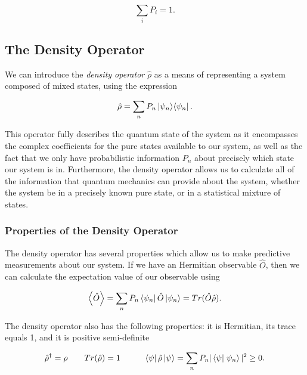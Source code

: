 \begin{equation}
  \label{eq:mixes_states_norm}
  \sum_i  P_i = 1.
\end{equation}


\subsection{The Density Operator} 
\label{the_density_operator} 

We can introduce the \emph{density operator} $\hat{\rho}$ as a means of representing a system composed of mixed states, using the expression

\begin{equation}
  \label{eq:density_operator}
  \hat{\rho} = \sum_n P_n \left| \psi_n \right> \! \left< \psi_n \right|.
\end{equation}

This operator fully describes the quantum state of the system as it
encompasses the complex coefficients for the pure states available to our
system, as well as the fact that we only have probabilistic information $P_n$ about precisely which state our system is in.  Furthermore, the density operator allows us to calculate all of the information that quantum mechanics can provide about the system, whether the system be in a precisely known pure state, or in a statistical mixture of states.



\subsubsection{Properties of the Density Operator}
\label{properties_of_the_density_operator} 

The density operator has several properties which allow us to make predictive measurements about our system.  If we have an Hermitian observable $\hat{O}$, then we can calculate the expectation value of our observable using \cite{cohen} 

\begin{equation}
  \label{eq:observable_from_density}
  \left< \hat{O} \right>  = \sum_{n} P_n \left< \psi_n \right| \hat{O} \left| \psi_n \right> =
Tr(\hat{O} \hat{\rho}).
\end{equation}

\noindent
The density operator also has the following properties: it is Hermitian, its trace equals 1, and it is positive semi-definite


\begin{eqnarray}
  \label{eq:density_properties}
  \hat{\rho}^\dagger = \rho \quad & \quad    Tr(\hat{\rho})=1      \quad &
\quad     \matrixel{\psi}{\hat{\rho}}{\psi}   =  \sum_n P_n
|\braket{\psi}{\psi_n}|^2  \ge 0.
\end{eqnarray} 

